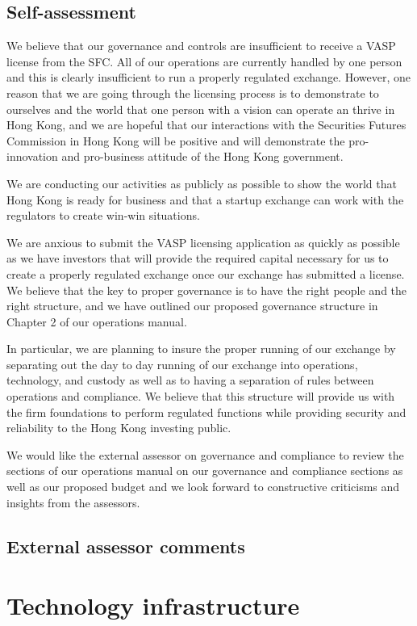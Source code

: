 \documentclass[]{report}
\begin{document}
\subsection{Self-assessment}
We believe that our governance and controls are insufficient
to receive a VASP license from the SFC.  All of our operations are
currently handled by one person and this is clearly insufficient to
run a properly regulated exchange.  However, one reason that we are
going through the licensing process is to demonstrate to ourselves and
the world that one person with a vision can operate an thrive in Hong
Kong, and we are hopeful that our interactions with the Securities
Futures Commission in Hong Kong will be positive and will demonstrate
the pro-innovation and pro-business attitude of the Hong Kong
government.

We are conducting our activities as publicly as possible to show the
world that Hong Kong is ready for business and that a startup exchange
can work with the regulators to create win-win situations.

We are anxious to submit the VASP licensing application as quickly as
possible as we have investors that will provide the required capital
necessary for us to create a properly regulated exchange once our
exchange has submitted a license.  We believe that the key to proper
governance is to have the right people and the right structure, and we
have outlined our proposed governance structure in Chapter 2 of our
operations manual.

In particular, we are planning to insure the proper running of our
exchange by separating out the day to day running of our exchange into
operations, technology, and custody as well as to having a separation
of rules between operations and compliance.  We believe that this
structure will provide us with the firm foundations to perform
regulated functions while providing security and reliability to the
Hong Kong investing public.

We would like the external assessor on governance and compliance to
review the sections of our operations manual on our governance and
compliance sections as well as our proposed budget and we look forward
to constructive criticisms and insights from the assessors.

\subsection{External assessor comments}

\section{Technology infrastructure}
\end{document}
